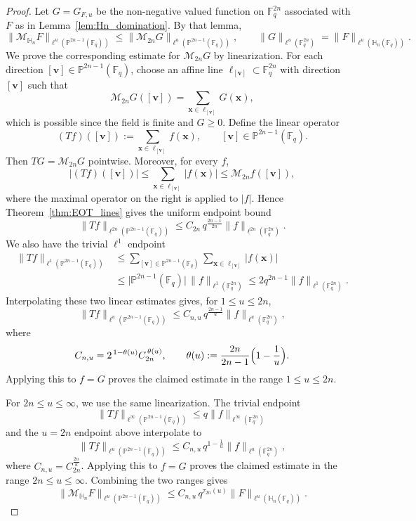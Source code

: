 \documentclass[11pt]{article}
\newcommand{\1}{\mathbf 1}
\begin{document}
\begin{proof}
{ 
Let $G=G_{F,u}$ be the non-negative valued function on $\mathbb{F}_q^{2n}$ associated with $F$ as in Lemma~\ref{lem:Hn_domination}. By that lemma,
\[
\|\mathcal{M}_{\mathbb{H}_n}F\|_{\ell^u(\mathbb{P}^{2n-1}(\mathbb{F}_q))}
\le
\|\mathcal{M}_{2n}G\|_{\ell^u(\mathbb{P}^{2n-1}(\mathbb{F}_q))},
\qquad
\|G\|_{\ell^u(\mathbb{F}_q^{2n})}
=
\|F\|_{\ell^u(\mathbb{H}_n(\mathbb{F}_q))}.
\]
We prove the corresponding estimate for $\mathcal{M}_{2n}G$ by linearization.
For each direction $[\mathbf v]\in\mathbb P^{2n-1}(\mathbb F_q)$, choose an affine line
$\ell_{[\mathbf v]}\subset\mathbb F_q^{2n}$ with direction $[\mathbf v]$ such that
\[
\mathcal{M}_{2n}G([\mathbf v])
=
\sum_{\mathbf x\in\ell_{[\mathbf v]}}G(\mathbf x),
\]
which is possible since the field is finite and $G\ge 0$. Define the linear operator
\[
(Tf)([\mathbf v])
:=
\sum_{\mathbf x\in\ell_{[\mathbf v]}} f(\mathbf x),
\qquad [\mathbf v]\in\mathbb P^{2n-1}(\mathbb F_q).
\]
Then $TG=\mathcal{M}_{2n}G$ pointwise. Moreover, for every $f$,
\[
|(Tf)([\mathbf v])|
\le
\sum_{\mathbf x\in\ell_{[\mathbf v]}} |f(\mathbf x)|
\le
\mathcal{M}_{2n}f([\mathbf v]),
\]
where the maximal operator on the right is applied to $|f|$.
Hence Theorem~\ref{thm:EOT_lines} gives the uniform endpoint bound
\[
\|Tf\|_{\ell^{2n}(\mathbb{P}^{2n-1}(\mathbb{F}_q))}
\le
C_{2n}\,q^{\frac{2n-1}{2n}}
\|f\|_{\ell^{2n}(\mathbb{F}_q^{2n})}.
\]
We also have the trivial $\ell^1$ endpoint
\[
\begin{aligned}
\|Tf\|_{\ell^1(\mathbb{P}^{2n-1}(\mathbb{F}_q))}
&\le
\sum_{[\mathbf v]\in\mathbb P^{2n-1}(\mathbb F_q)}
\sum_{\mathbf x\in\ell_{[\mathbf v]}} |f(\mathbf x)|  \\
&\le
\bigl|\mathbb P^{2n-1}(\mathbb F_q)\bigr|\,
\|f\|_{\ell^1(\mathbb F_q^{2n})}
\le
2q^{2n-1}\|f\|_{\ell^1(\mathbb F_q^{2n})}.
\end{aligned}
\]
Interpolating these two linear estimates gives, for $1\le u\le 2n$,
\[
\|Tf\|_{\ell^u(\mathbb{P}^{2n-1}(\mathbb{F}_q))}
\le
C_{n,u}\,q^{\frac{2n-1}{u}}
\|f\|_{\ell^u(\mathbb F_q^{2n})},
\]
where
\[
C_{n,u}=2^{\,1-\theta(u)}C_{2n}^{\,\theta(u)},
\qquad
\theta(u):=\frac{2n}{2n-1}\Bigl(1-\frac1u\Bigr).
\]
Applying this to $f=G$ proves the claimed estimate in the range $1\le u\le 2n$.

For $2n\le u\le\infty$, we use the same linearization. The trivial endpoint
\[
\|Tf\|_{\ell^\infty(\mathbb P^{2n-1}(\mathbb F_q))}
\le
q\|f\|_{\ell^\infty(\mathbb F_q^{2n})}
\]
and the $u=2n$ endpoint above interpolate to
\[
\|Tf\|_{\ell^u(\mathbb{P}^{2n-1}(\mathbb{F}_q))}
\le
C_{n,u}\,q^{1-\frac1u}
\|f\|_{\ell^u(\mathbb F_q^{2n})},
\]
where $C_{n,u}=C_{2n}^{\frac{2n}{u}}$. Applying this to $f=G$ proves the claimed estimate in the range $2n\le u\le\infty$.
Combining the two ranges gives
\[
\|\mathcal{M}_{\mathbb{H}_n}F\|_{\ell^u(\mathbb{P}^{2n-1}(\mathbb{F}_q))}
\le
C_{n,u}\,q^{\tau_{2n}(u)}
\|F\|_{\ell^u(\mathbb{H}_n(\mathbb{F}_q))}.
\]
}
\end{proof}
\end{document}
